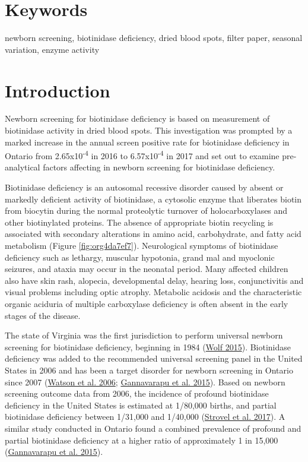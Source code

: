 \documentclass[review]{elsarticle}
\begin{document}
\section*{Keywords}
\label{sec:orgdd8f5d2}
newborn screening, biotinidase deficiency, dried blood spots, filter
paper, seasonal variation, enzyme activity
\section*{Introduction}
\label{sec:orgee22342}

Newborn screening for biotinidase deficiency is based on measurement
of biotinidase activity in dried blood spots. This investigation was
prompted by a marked increase in the annual screen positive rate for
biotinidase deficiency in Ontario from 2.65x10\textsuperscript{-4} in 2016 to
6.57x10\textsuperscript{-4} in 2017 and set out to examine pre-analytical factors
affecting in newborn screening for biotinidase deficiency.

Biotinidase deficiency is an autosomal recessive disorder caused by
absent or markedly deficient activity of biotinidase, a cytosolic
enzyme that liberates biotin from biocytin during the normal
proteolytic turnover of holocarboxylases and other biotinylated
proteins. The absence of appropriate biotin recycling is associated
with secondary alterations in amino acid, carbohydrate, and fatty acid
metabolism (Figure \ref{fig:org4da7ef7}). Neurological symptoms of biotinidase
deficiency such as lethargy, muscular hypotonia, grand mal and
myoclonic seizures, and ataxia may occur in the neonatal period. Many
affected children also have skin rash, alopecia, developmental delay,
hearing loss, conjunctivitis and visual problems including optic
atrophy. Metabolic acidosis and the characteristic organic aciduria of
multiple carboxylase deficiency is often absent in the early stages of
the disease.

The state of Virginia was the first jurisdiction to perform universal
newborn screening for biotinidase deficiency, beginning in 1984 (\hyperlink{citeproc_bib_item_15}{Wolf 2015}). Biotinidase deficiency was added to the recommended
universal screening panel in the United States in 2006 and has been a
target disorder for newborn screening in Ontario since 2007 (\hyperlink{citeproc_bib_item_13}{Watson et al. 2006}; \hyperlink{citeproc_bib_item_5}{Gannavarapu et al. 2015}). Based on newborn screening
outcome data from 2006, the incidence of profound biotinidase
deficiency in the United States is estimated at 1/80,000 births, and
partial biotinidase deficiency between 1/31,000 and 1/40,000 (\hyperlink{citeproc_bib_item_10}{Strovel et al. 2017}). A similar study conducted in Ontario found a
combined prevalence of profound and partial biotinidase deficiency at
a higher ratio of approximately 1 in 15,000 (\hyperlink{citeproc_bib_item_5}{Gannavarapu et al. 2015}).
\end{document}
